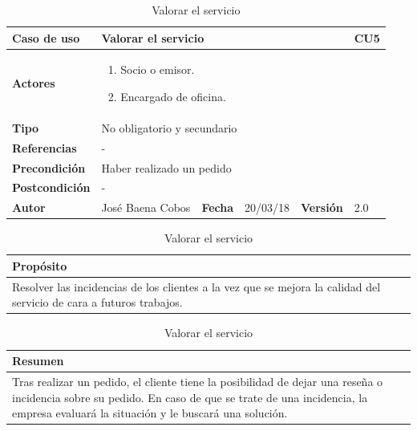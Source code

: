 \documentclass[12pt,spanish]{article}
\begin{document}
\begin{table}[H]
\centering
\begin{tabular}{|m{3cm}|m{4cm}|m{2cm}|m{2cm}|m{2cm}|m{1cm}|}
\hline
\textbf{Caso de uso} &  \multicolumn{4}{m{8cm}|}{Valorar el servicio} \vline &  \cellcolor{gray!40}CU5 \\
\hline
\textbf{Actores} & \multicolumn{5}{m{8cm}|}{\begin{enumerate}
		\item Socio o emisor.
		\item Encargado de oficina.
	\end{enumerate}} \\
\hline
\textbf{Tipo} & \multicolumn{5}{m{8cm}|}{No obligatorio y secundario} \\
\hline
\textbf{Referencias} &\multicolumn{5}{m{8cm}|}{-} \\
\hline
\textbf{Precondición} & \multicolumn{5}{m{8cm}|}{Haber realizado un pedido} \\
\hline
\textbf{Postcondición} & \multicolumn{5}{m{8cm}|}{-} \\
\hline
\textbf{Autor} & José Baena Cobos & \textbf{Fecha} & 20/03/18 & \textbf{Versión} & 2.0 \\
\hline
\end{tabular}

\vspace{1cm}

\begin{tabular}{|m{16.2cm}|}
\hline
\textbf{Propósito} \\
\hline
Resolver las incidencias de los clientes a la vez que se mejora la calidad del servicio de cara a futuros trabajos. \\
\hline
\end{tabular}

\vspace{1cm}

\begin{tabular}{|m{16.2cm}|}
\hline
\textbf{Resumen} \\
\hline
Tras realizar un pedido, el cliente tiene la posibilidad de dejar una reseña o incidencia sobre su pedido. En caso de que se trate de una incidencia, la empresa evaluará la situación y le buscará una solución. \\
\hline
\end{tabular}

\caption{Valorar el servicio}
\label{cu:5}
\end{table}


\end{document}
